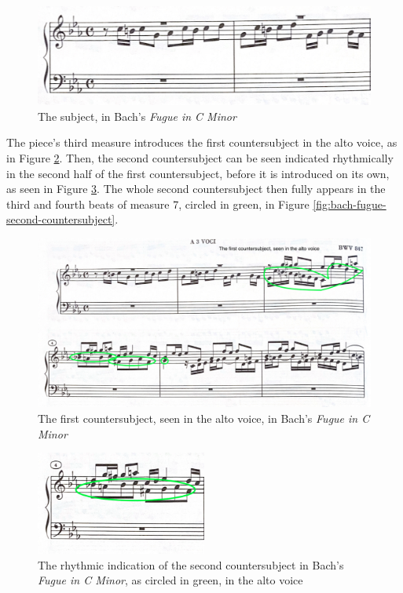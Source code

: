 \begin{figure}
    \centering
    \includegraphics[width=\textwidth]{figures/bach-fugue-subject.jpg}
    \caption{The subject, in Bach's \textit{Fugue in C Minor}}
    \label{fig:bach-fugue-subject}
\end{figure}

The piece's third measure introduces the first countersubject in the alto voice, as in Figure \ref{fig:bach-fugue-first-countersubject}\autocite{Henle_2009}. Then, the second countersubject can be seen indicated rhythmically in the second half of the first countersubject, before it is introduced on its own, as seen in Figure \ref{fig:bach-fugue-second-cs-indication}\autocite{Henle_2009}. The whole second countersubject then fully appears in the third and fourth beats of measure 7, circled in green, in Figure \ref{fig:bach-fugue-second-countersubject}\autocite{Henle_2009}.

\begin{figure}
    \centering
    \includegraphics[width=\textwidth]{figures/bach-fugue-first-countersubject.jpg}
    \caption{The first countersubject, seen in the alto voice, in Bach's \textit{Fugue in C Minor}}
    \label{fig:bach-fugue-first-countersubject}
\end{figure}

\begin{figure}
    \centering
    \includegraphics[width=0.5\textwidth]{figures/bach-fugue-second-cs-indication.jpg}
    \caption{The rhythmic indication of the second countersubject in Bach's \textit{Fugue in C Minor}, as circled in green, in the alto voice}
    \label{fig:bach-fugue-second-cs-indication}
\end{figure}

